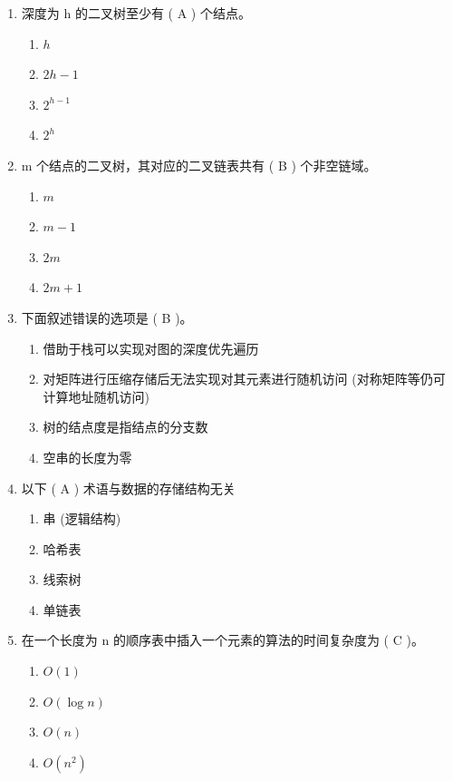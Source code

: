 \documentclass[12pt, a4paper]{article}
\begin{document}
\begin{enumerate}[label=\arabic*.]
    \item 深度为 h 的二叉树至少有 ( A ) 个结点。
    \begin{enumerate}
        \item $h$
        \item $2h-1$
        \item $2^{h-1}$
        \item $2^h$
    \end{enumerate}

    \item m 个结点的二叉树，其对应的二叉链表共有 ( B ) 个非空链域。
    \begin{enumerate}
        \item $m$
        \item $m-1$
        \item $2m$
        \item $2m+1$
    \end{enumerate}

    \item 下面叙述错误的选项是 ( B )。
    \begin{enumerate}
        \item 借助于栈可以实现对图的深度优先遍历
        \item 对矩阵进行压缩存储后无法实现对其元素进行随机访问 (对称矩阵等仍可计算地址随机访问)
        \item 树的结点度是指结点的分支数
        \item 空串的长度为零
    \end{enumerate}

    \item 以下 ( A ) 术语与数据的存储结构无关
    \begin{enumerate}
        \item 串 (逻辑结构)
        \item 哈希表
        \item 线索树
        \item 单链表
    \end{enumerate}

    \item 在一个长度为 n 的顺序表中插入一个元素的算法的时间复杂度为 ( C )。
    \begin{enumerate}
        \item $O(1)$
        \item $O(\log n)$
        \item $O(n)$
        \item $O(n^2)$
    \end{enumerate}


\end{enumerate}
\end{document}
